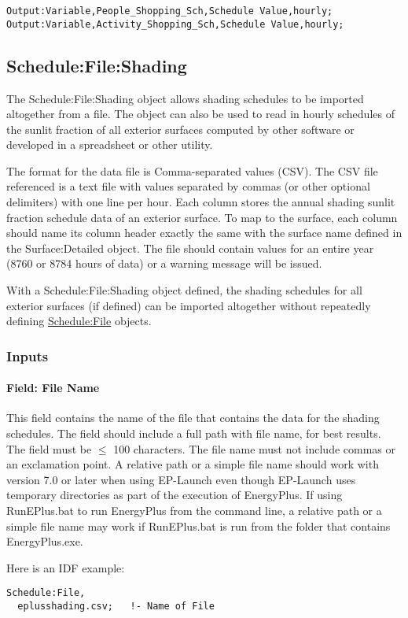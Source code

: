 \begin{lstlisting}
Output:Variable,People_Shopping_Sch,Schedule Value,hourly;
Output:Variable,Activity_Shopping_Sch,Schedule Value,hourly;
\end{lstlisting}

\subsection{Schedule:File:Shading}\label{schedulefileshading}

The Schedule:File:Shading object allows shading schedules to be imported altogether from a file. The object can also be used to read in hourly schedules of the sunlit fraction of all exterior surfaces computed by other software or developed in a spreadsheet or other utility.

The format for the data file is Comma-separated values (CSV). The CSV file referenced is a text file with values separated by commas (or other optional delimiters) with one line per hour. Each column stores the annual shading sunlit fraction schedule data of an exterior surface. To map to the surface, each column should name its column header exactly the same with the surface name defined in the Surface:Detailed object. The file should contain values for an entire year (8760 or 8784 hours of data) or a warning message will be issued.

With a Schedule:File:Shading object defined, the shading schedules for all exterior surfaces (if defined) can be imported altogether without repeatedly defining \hyperref[schedulefile]{Schedule:File} objects.

\subsubsection{Inputs}\label{inputs-schedule-file-shading}

\paragraph{Field: File Name}\label{field-file-name}

This field contains the name of the file that contains the data for the shading schedules. The field should include a full path with file name, for best results. The field must be \(\le\) 100 characters. The file name must not include commas or an exclamation point. A relative path or a simple file name should work with version 7.0 or later when using EP-Launch even though EP-Launch uses temporary directories as part of the execution of EnergyPlus. If using RunEPlus.bat to run EnergyPlus from the command line, a relative path or a simple file name may work if RunEPlus.bat is run from the folder that contains EnergyPlus.exe.

Here is an IDF example:

\begin{lstlisting}
Schedule:File,
  eplusshading.csv;   !- Name of File
\end{lstlisting}